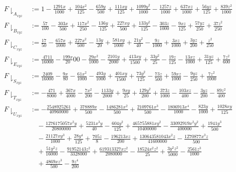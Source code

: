 \begin{align*}
F\downharpoonright_{A_{xyz}} &:= 1 - \frac{1291x}{1000} + \frac{104x^2}{125} - \frac{659y}{500} + \frac{111xy}{125} + \frac{1099y^2}{1000} - \frac{1257z}{1000} + \frac{637xz}{1000} + \frac{56yz}{125} + \frac{839z^2}{1000} \\
F\downharpoonright_{B_{xyz}} &:= \frac{57}{100} - \frac{303x}{500} + \frac{117x^2}{250} - \frac{136y}{125} + \frac{227xy}{500} + \frac{133y^2}{125} - \frac{303z}{1000} - \frac{9xz}{125} + \frac{57yz}{250} + \frac{37z^2}{250}\\
F\downharpoonright_{C_{xyz}} &:= \frac{17}{50} - \frac{657x}{1000} + \frac{227x^2}{500} - \frac{13y}{20} + \frac{581xy}{1000} + \frac{21y^2}{40} - \frac{9z}{1000} + \frac{3xz}{1000} + \frac{3yz}{200} + \frac{z^2}{250}\\
F\downharpoonright_{E_{xyz}} &:= \frac{4711}{16000} - \frac{199x}{20}00 - \frac{29x^2}{1000} - \frac{2101y}{2000} + \frac{413xy}{1500} + \frac{33y^2}{25} - \frac{19z}{125} - \frac{13xz}{1000} + \frac{31yz}{125} + \frac{7z^2}{600}\\
F\downharpoonright_{S_{xyz}} &:= \frac{2409}{16000} - \frac{9x}{80} - \frac{61x^2}{1000} - \frac{493y}{1000} + \frac{401xy}{1500} + \frac{73y^2}{125} - \frac{73z}{500} + \frac{59xz}{1000} - \frac{9yz}{250} + \frac{7z^2}{1000}\\
F\downharpoonright_{T_{xyz}} &:= -\frac{471}{8000} + \frac{367x}{4000} - \frac{7x^2}{200} - \frac{1133y}{2000} + \frac{9xy}{25} + \frac{129y^2}{200} + \frac{373z}{1000} - \frac{103xz}{400} - \frac{3yz}{200} - \frac{89z^2}{400}\\
F\downharpoonright_{U_{xyz}} &:= -\frac{2548925261}{40960000} + \frac{378889x}{500} - \frac{1486281x^2}{500} + \frac{2109761x^3}{500} - \frac{1806913x^4}{1000} - \frac{823y}{1000} + \frac{1028xy}{125} \\
&\quad - \frac{1276175057x^2y}{20800000} + \frac{5231x^3y}{40} - \frac{604y^2}{125} + \frac{465755881xy^2}{10400000} - \frac{33092919x^2y^2}{400000} + \frac{1941y^3}{500} \\
&\quad - \frac{21127xy^3}{1000} + \frac{28y^4}{125} + \frac{705z}{8} - \frac{196213xz}{200} + \frac{130643581043x^2z}{41600000} - \frac{1270877x^3z}{500} \\
&\quad + \frac{51y^2z}{16000} - \frac{91952143z^2}{3328000} + \frac{619313327xz^2}{2080000} - \frac{18524x^2z^2}{25} + \frac{3y^2z^2}{5000} - \frac{2561z^3}{1000} \\
&\quad + \frac{4869xz^3}{500} - \frac{9z^4}{200}\\

\end{align*}
